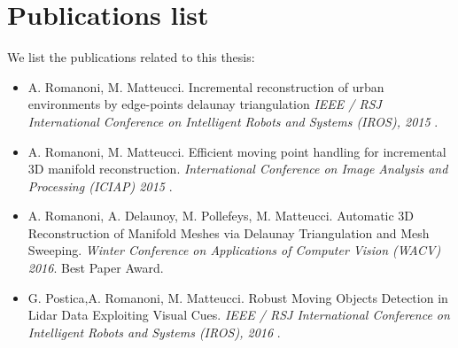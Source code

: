 \section{Publications list}
We list the publications related to this thesis:
\begin{itemize}
 \item  A. Romanoni, M. Matteucci. Incremental reconstruction of urban environments by edge-points delaunay triangulation  \emph{IEEE / RSJ International Conference on Intelligent Robots and Systems (IROS), 2015} \cite{romanoni15b}.
 \item A. Romanoni, M. Matteucci. Efficient moving point handling for incremental 3D manifold reconstruction. \emph{International Conference on Image Analysis and Processing (ICIAP) 2015} \cite{romanoni15a}.
 \item A. Romanoni, A. Delaunoy, M. Pollefeys, M. Matteucci. Automatic 3D Reconstruction of Manifold Meshes via Delaunay Triangulation and Mesh Sweeping. \emph{Winter Conference on Applications of Computer Vision (WACV) 2016}. Best Paper Award. \cite{romanoni16}
 \item G. Postica,A. Romanoni, M. Matteucci. Robust Moving Objects Detection in Lidar Data Exploiting Visual Cues. \emph{IEEE / RSJ International Conference on Intelligent Robots and Systems (IROS), 2016}  \cite{postica16}.
\end{itemize}










